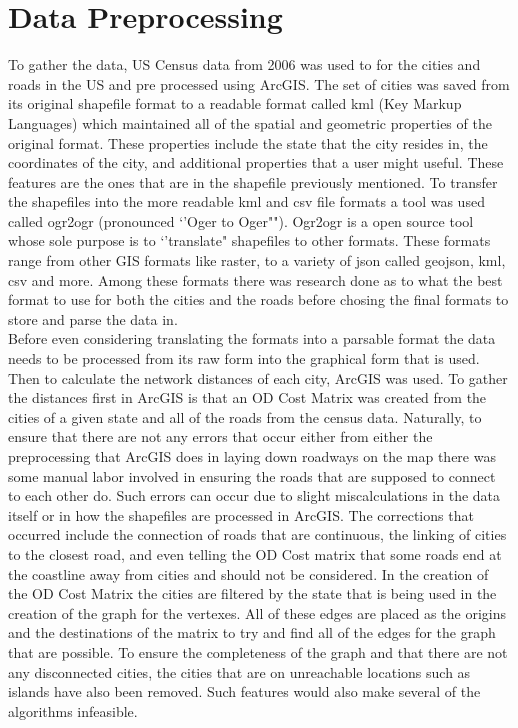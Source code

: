 \documentclass[midd]{thesis}
\newcommand{\tab}{\hspace*{2em}}
\begin{document}
\section{Data Preprocessing}
\tab To gather the data, US Census data from 2006 was used to for the cities and roads in the US and pre processed using ArcGIS. The set of cities was saved from its original shapefile format to a readable format called kml (Key Markup Languages) which maintained all of the spatial and geometric properties of the original format. These properties include the state that the city resides in, the coordinates of the city, and additional properties that a user might useful. These features are the ones that are in the shapefile previously mentioned. To transfer the shapefiles into the more readable kml and csv file formats a tool was used called ogr2ogr (pronounced `'Oger to Oger""). Ogr2ogr is a open source tool whose sole purpose is to `'translate" shapefiles to other formats. These formats range from other GIS formats like raster, to a variety of json called geojson, kml, csv and more. Among these formats there was research done as to what the best format to use for both the cities and the roads before chosing the final formats to store and parse the data in.\\
\tab Before even considering translating the formats into a parsable format the data needs to be processed from its raw form into the graphical form that is used. Then to calculate the network distances of each city, ArcGIS was used. To gather the distances first in ArcGIS is that an OD Cost Matrix was created from the cities of a given state and all of the roads from the census data. Naturally, to ensure that there are not any errors that occur either from either the preprocessing that ArcGIS does in laying down roadways on the map there was some manual labor involved in ensuring the roads that are supposed to connect to each other do. Such errors can occur due to slight miscalculations in the data itself or in how the shapefiles are processed in ArcGIS. The corrections that occurred include the connection of roads that are continuous, the linking of cities to the closest road, and even telling the OD Cost matrix that  some roads end at the coastline away from cities and should not be considered. In the creation of the OD Cost Matrix the cities are filtered by the state that is being used in the creation of the graph for the vertexes. All of these edges are placed as the origins and the destinations of the matrix to try and find all of the edges for the graph that are possible. To ensure the completeness of the graph and that there are not any disconnected cities, the cities that are on unreachable locations such as islands have also been removed. Such features would also make several of the algorithms infeasible.\\
\end{document}
